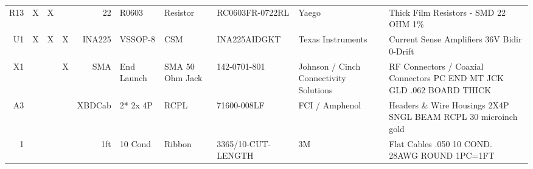 \documentclass[twoside,11pt]{cergdoc}
\begin{document}
\begin{appendix}
\begin{table}[ht]
{\begin{tabular}{r|ccc|rlllp{2.5cm}p{6.5cm}}
R13  & X & X &   & 22 & R0603 & Resistor & RC0603FR-0722RL & Yaego & Thick Film Resistors - SMD 22 OHM 1\%   \\
U1   & X & X & X & INA225 & VSSOP-8 & CSM & INA225AIDGKT & Texas Instruments & Current Sense Amplifiers 36V Bidir 0-Drift \\
X1   &   &   & X & SMA & End Launch & SMA 50 Ohm Jack & 142-0701-801  & Johnson / Cinch Connectivity Solutions  & RF Connectors / Coaxial Connectors PC END MT JCK GLD .062 BOARD THICK    \\ \hline
A3   &   &   &   & XBDCab & 2* 2x 4P & RCPL  & 71600-008LF & FCI / Amphenol & Headers  \&  Wire Housings 2X4P SNGL BEAM RCPL 30 microinch gold   \\
1    &   &   &   & 1ft & 10 Cond & Ribbon & 3365/10-CUT-LENGTH & 3M & Flat Cables .050 10 COND. 28AWG ROUND 1PC=1FT   \\
  \end{tabular}}
\end{table}

\end{appendix}
\end{document}
